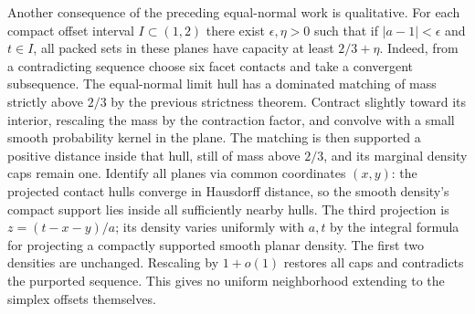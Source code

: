 \documentclass[
  10pt,
]{article}
\begin{document}
Another consequence of the preceding equal-normal work is qualitative.
For each compact offset interval \(I\subset(1,2)\) there exist
\(\epsilon,\eta>0\) such that if \(|a-1|<\epsilon\) and \(t\in I\), all
packed sets in these planes have capacity at least \(2/3+\eta\). Indeed,
from a contradicting sequence choose six facet contacts and take a
convergent subsequence. The equal-normal limit hull has a dominated
matching of mass strictly above \(2/3\) by the previous strictness
theorem. Contract slightly toward its interior, rescaling the mass by
the contraction factor, and convolve with a small smooth probability
kernel in the plane. The matching is then supported a positive distance
inside that hull, still of mass above \(2/3\), and its marginal density
caps remain one. Identify all planes via common coordinates \((x,y)\):
the projected contact hulls converge in Hausdorff distance, so the
smooth density's compact support lies inside all sufficiently nearby
hulls. The third projection is \(z=(t-x-y)/a\); its density varies
uniformly with \(a,t\) by the integral formula for projecting a
compactly supported smooth planar density. The first two densities are
unchanged. Rescaling by \(1+o(1)\) restores all caps and contradicts the
purported sequence. This gives no uniform neighborhood extending to the
simplex offsets themselves.
\end{document}
